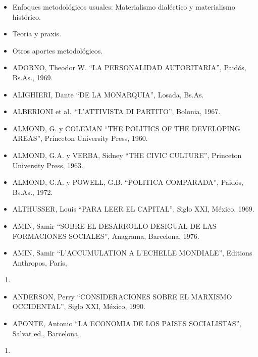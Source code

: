 \documentclass[
]{book}
\providecommand{\tightlist}{%
  \setlength{\itemsep}{0pt}\setlength{\parskip}{0pt}}
\begin{document}
\begin{itemize}
  \begin{itemize}
  \tightlist
  \item
    Enfoques metodológicos usuales: Materialismo dialéctico y materialismo histórico.
  \item
    Teoría y praxis.
  \item
    Otros aportes metodológicos.
  \end{itemize}
\end{itemize}

\begin{itemize}
\tightlist
\item
  ADORNO, Theodor W. ``LA PERSONALIDAD AUTORITARIA'', Paidós, Bs.As., 1969.
\item
  ALIGHIERI, Dante ``DE LA MONARQUIA'', Losada, Bs.As.
\item
  ALBERIONI et al.~``L'ATTIVISTA DI PARTITO'', Bolonia, 1967.
\item
  ALMOND, G. y COLEMAN ``THE POLITICS OF THE DEVELOPING AREAS'', Princeton
  University Press, 1960.
\item
  ALMOND, G.A. y VERBA, Sidney ``THE CIVIC CULTURE'', Princeton University Press, 1963.
\item
  ALMOND, G.A. y POWELL, G.B. ``POLITICA COMPARADA'', Paidós, Bs.As., 1972.
\item
  ALTHUSSER, Louis ``PARA LEER EL CAPITAL'', Siglo XXI, México, 1969.
\item
  AMIN, Samir ``SOBRE EL DESARROLLO DESIGUAL DE LAS FORMACIONES SOCIALES'',
  Anagrama, Barcelona, 1976.
\item
  AMIN, Samir ``L'ACCUMULATION A L'ECHELLE MONDIALE'', Editions Anthropos, París,
\end{itemize}

\begin{enumerate}
\def\labelenumi{\arabic{enumi}.}
\setcounter{enumi}{1969}
\tightlist
\item
\end{enumerate}

\begin{itemize}
\tightlist
\item
  ANDERSON, Perry ``CONSIDERACIONES SOBRE EL MARXISMO OCCIDENTAL'', Siglo XXI,
  México, 1990.
\item
  APONTE, Antonio ``LA ECONOMIA DE LOS PAISES SOCIALISTAS'', Salvat ed., Barcelona,
\end{itemize}

\begin{enumerate}
\def\labelenumi{\arabic{enumi}.}
\setcounter{enumi}{1972}
\tightlist
\item
\end{enumerate}
\end{document}
